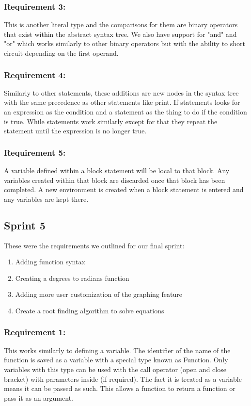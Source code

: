 \documentclass[a4paper, oneside, 11pt]{report}
\begin{document}
\subsubsection{Requirement 3:}
This is another literal type and the comparisons for them are binary operators that exist within the abstract syntax tree. We also have support for "and" and "or" which works similarly to other binary operators but with the ability to short circuit depending on the first operand.
\subsubsection{Requirement 4:}
Similarly to other statements, these additions are new nodes in the syntax tree with the same precedence as other statements like print. If statements looks for an expression as the condition and a statement as the thing to do if the condition is true. While statements work similarly except for that they repeat the statement until the expression is no longer true.
\subsubsection{Requirement 5:}
A variable defined within a block statement will be local to that block. Any variables created within that block are discarded once that block has been completed. A new environment is created when a block statement is entered and any variables are kept there.

\subsection{Sprint 5}
These were the requirements we outlined for our final sprint:
\begin{enumerate}
\item Adding function syntax
\item Creating a degrees to radians function
\item Adding more user customization of the graphing feature
\item Create a root finding algorithm to solve equations
\end{enumerate}

\subsubsection{Requirement 1:}
This works similarly to defining a variable. The identifier of the name of the function is saved as a variable with a special type known as Function. Only variables with this type can be used with the call operator (open and close bracket) with parameters inside (if required). The fact it is treated as a variable means it can be passed as such. This allows a function to return a function or pass it as an argument.
\end{document}
